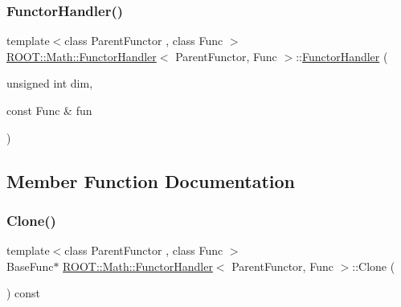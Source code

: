 \subsubsection{\texorpdfstring{FunctorHandler()}{FunctorHandler()}\hspace{0.1cm}{\footnotesize\ttfamily [4/4]}}
{\footnotesize\ttfamily template$<$class Parent\+Functor , class Func $>$ \\
\mbox{\hyperlink{classROOT_1_1Math_1_1FunctorHandler}{R\+O\+O\+T\+::\+Math\+::\+Functor\+Handler}}$<$ Parent\+Functor, Func $>$\+::\mbox{\hyperlink{classROOT_1_1Math_1_1FunctorHandler}{Functor\+Handler}} (\begin{DoxyParamCaption}\item[{unsigned int}]{dim,  }\item[{const Func \&}]{fun }\end{DoxyParamCaption})\hspace{0.3cm}{\ttfamily [inline]}}



\subsection{Member Function Documentation}
\mbox{\label{classROOT_1_1Math_1_1FunctorHandler_ad20fb7defe76e6abc244eff203aabbc6}} 
\subsubsection{\texorpdfstring{Clone()}{Clone()}\hspace{0.1cm}{\footnotesize\ttfamily [1/2]}}
{\footnotesize\ttfamily template$<$class Parent\+Functor , class Func $>$ \\
Base\+Func$\ast$ \mbox{\hyperlink{classROOT_1_1Math_1_1FunctorHandler}{R\+O\+O\+T\+::\+Math\+::\+Functor\+Handler}}$<$ Parent\+Functor, Func $>$\+::Clone (\begin{DoxyParamCaption}{ }\end{DoxyParamCaption}) const\hspace{0.3cm}{\ttfamily [inline]}}

